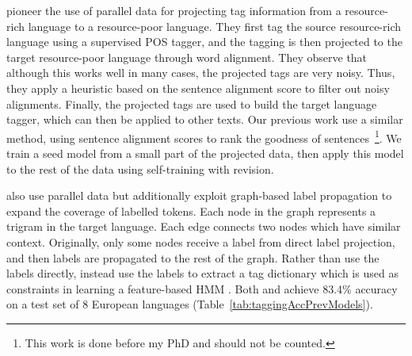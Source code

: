 \documentclass[12pt,twoside,final,hidelinks]{ltthesis}
\theoremstyle{definition}
\begin{document}
 pioneer the use of parallel data for projecting tag information from a resource-rich language to a resource-poor language. They first tag the source resource-rich language using a supervised POS tagger, and the tagging is then projected to the target resource-poor language through word alignment. They observe that although this works well in many cases, the projected tags are very noisy. Thus, they apply a heuristic based on the sentence alignment score to filter out noisy alignments. Finally, the projected tags are used to build the target language tagger, which can then be applied to other texts. Our previous work use a similar method, using sentence alignment scores to rank the goodness of sentences~\cite{Duongacl13}\footnote{This work is done before my PhD and should not be counted.}. We train a seed model from a small part of the projected data, then apply this model to the rest of the data using self-training with revision.

 also use parallel data but additionally exploit graph-based label propagation to expand the coverage of labelled tokens. Each node in the graph represents a trigram in the target language. Each edge connects two nodes which have similar context. Originally, only some nodes receive a label from direct label projection, and then labels are propagated to the rest of the graph. Rather than use the labels directly,  instead use the labels to extract a tag dictionary which is used as constraints in learning a feature-based HMM \cite{featurebaseHMM}. Both  and  achieve 83.4\% accuracy on a test set of 8 European languages (Table~\ref{tab:taggingAccPrevModels}).
\end{document}
